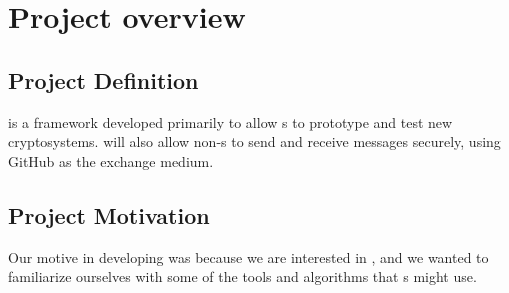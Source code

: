\section{Project overview}


\subsection{Project Definition}
\cry{} is a framework developed primarily to allow \cg{}s to
prototype and test new cryptosystems. \cry{} will also allow
non-\cg{}s to send and receive messages securely, using
GitHub as the exchange medium.

\subsection{Project Motivation}
Our motive in developing \cry{} was because we are
interested in \cgy{}, and we wanted to familiarize ourselves
with some of the tools and algorithms that \cg{}s might use.
